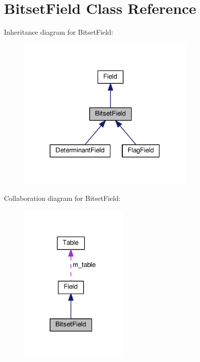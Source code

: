 \hypertarget{classBitsetField}{}\section{Bitset\+Field Class Reference}
\label{classBitsetField}


Inheritance diagram for Bitset\+Field\+:
\nopagebreak
\begin{figure}[H]
\begin{center}
\leavevmode
\includegraphics[width=246pt]{classBitsetField__inherit__graph}
\end{center}
\end{figure}


Collaboration diagram for Bitset\+Field\+:
\nopagebreak
\begin{figure}[H]
\begin{center}
\leavevmode
\includegraphics[width=150pt]{classBitsetField__coll__graph}
\end{center}
\end{figure}
